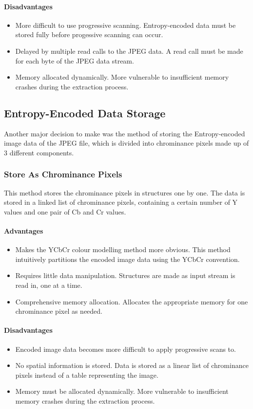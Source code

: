 \paragraph*{Disadvantages}
\begin{itemize}
	\item More difficult to use progressive scanning. Entropy-encoded data must be stored fully before progessive scanning can occur.
	\item Delayed by multiple read calls to the JPEG data. A read call must be made for each byte of the JPEG data stream.
	\item Memory allocated dynamically. More vulnerable to insufficient memory crashes during the extraction process.
\end{itemize}

\subsection{Entropy-Encoded Data Storage}

Another major decision to make was the method of storing the Entropy-encoded image data of the JPEG file, 
which is divided into chrominance pixels made up of 3 different components.

\subsubsection{Store As Chrominance Pixels}

This method stores the chrominance pixels in structures one by one. 
The data is stored in a linked list of chrominance pixels, containing a certain number of Y values and one pair of Cb and Cr values.

\paragraph*{Advantages}
\begin{itemize}
	\item Makes the YCbCr colour modelling method more obvious. 
		This method intuitively partitions the encoded image data using the YCbCr convention.
	\item Requires little data manipulation. Structures are made as input stream is read in, one at a time.
	\item Comprehensive memory allocation. Allocates the appropriate memory for one chrominance pixel as needed.
\end{itemize}

\paragraph*{Disadvantages}
\begin{itemize}
	\item Encoded image data becomes more difficult to apply progressive scans to.
	\item No spatial information is stored. Data is stored as a linear list of chrominance pixels instead of a table representing the image.
	\item Memory must be allocated dynamically. More vulnerable to insufficient memory crashes during the extraction process.
\end{itemize}

